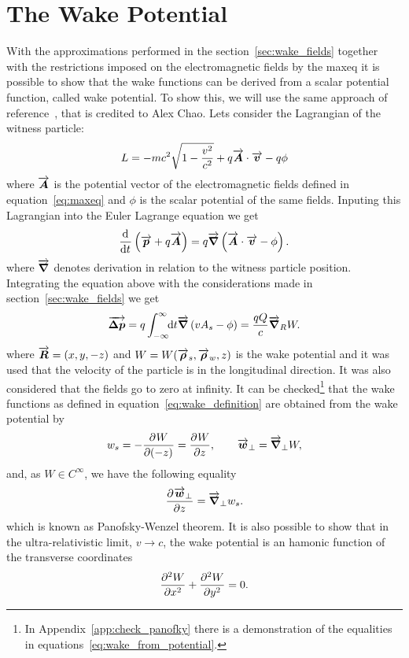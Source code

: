 \documentclass[
	12pt,				%
	openright,			%
	oneside,			%
	a4paper,		%
	chapter=TITLE,		%
	section=TITLE,		%
    brazil,				%
	english,			%
	sumario=tradicional,
	]{abntex2}
\begin{document}
  \section{The Wake Potential}

  With the approximations performed in the section~\ref{sec:wake_fields} together with the restrictions imposed on the electromagnetic fields by the \gls{maxeq} it is possible to show that the wake functions can be derived from a scalar potential function, called wake potential. To show this, we will use the same approach of reference~\cite{Stupakov2000a}, that is credited to Alex Chao. Lets consider the Lagrangian of the witness particle:
  \begin{align}
  	  L = -mc^2\sqrt{1 - \frac{v^2}{c^2}} + q\vect{A}\cdot\vect{v} - q\phi
  \end{align}
  where $\vect{A}$ is the potential vector of the electromagnetic fields defined in equation~\eqref{eq:maxeq} and $\phi$ is the scalar potential of the same fields. Inputing this Lagrangian into the Euler Lagrange equation we get
  \begin{align}
	  \dertot{}{t} \left(\vect{p} + q\vect{A}\right) = q\vect{\nabla}\left( \vect{A}\cdot\vect{v} - \phi\right).
  \end{align}
  where $\vect{\nabla}$ denotes derivation in relation to the witness particle position. Integrating the equation above with the considerations made in section~\ref{sec:wake_fields} we get
  \begin{align}
   \vect{\Delta p} = q\infint{t}{\vect{\nabla}\left(vA_s - \phi \right)} = \frac{qQ}{c} \vect{\nabla}_R W.
  \end{align}
  where $\vect{R} =(x, y, -z)$ and $W = W(\vect{\rho}_s, \vect{\rho}_w, z)$ is the wake potential and it was used that the velocity of the particle is in the longitudinal direction. It was also considered that the fields go to zero at infinity. It can be checked\footnote{In Appendix~\ref{app:check_panofky} there is a demonstration of the equalities in equations~\eqref{eq:wake_from_potential}.} that the wake functions as defined in equation~\eqref{eq:wake_definition} are obtained from the wake potential by
  \begin{align}\label{eq:wake_from_potential}
   w_s = - \derpar{W}{(-z)} = \derpar{W}{z},\qquad \vect{w}_\perp = \vect{\nabla}_\perp W,
  \end{align}
  and, as $W \in C^{\infty}$, we have the following equality
  \begin{align}\label{eq:panofsky_wenzel_theorem}
   \derpar{\vect{w}_\perp}{z} = \vect{\nabla}_\perp w_s.
  \end{align}
  which is known as Panofsky-Wenzel theorem. It is also possible to show that in the ultra-relativistic limit, $v \to c$, the wake potential is an hamonic function of the transverse coordinates
  \begin{align}\label{eq:potential_harmonic}
  	  \derpar[2]{W}{x} + \derpar[2]{W}{y} = 0.
  \end{align}
\end{document}
